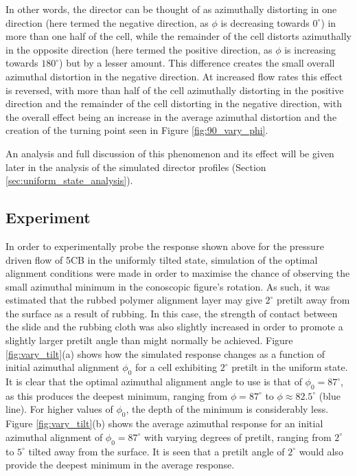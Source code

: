 In other words, the director can be thought of as azimuthally distorting in one direction (here termed the negative direction, as $\phi$ is decreasing towards $0^{\circ}$) in more than one half of the cell, while the remainder of the cell distorts azimuthally in the opposite direction (here termed the positive direction, as $\phi$ is increasing towards $180^{\circ}$) but by a lesser amount. This difference creates the small overall azimuthal distortion in the negative direction. At increased flow rates this effect is reversed, with more than half of the cell azimuthally distorting in the positive direction and the remainder of the cell distorting in the negative direction, with the overall effect being an increase in the average azimuthal distortion and the creation of the turning point seen in Figure \ref{fig:90_vary_phi}. 

An analysis and full discussion of this phenomenon and its effect will be given later in the analysis of the simulated director profiles (Section \ref{sec:uniform_state_analysis}).

\subsection{Experiment}
\label{sec:uniform_experiment}
In order to experimentally probe the response shown above for the pressure driven flow of 5CB in the uniformly tilted state, simulation of the optimal alignment conditions were made in order to maximise the chance of observing the small azimuthal minimum in the conoscopic figure's rotation. As such, it was estimated that the rubbed polymer alignment layer may give $2^{\circ}$ pretilt away from the surface as a result of rubbing. In this case, the strength of contact between the slide and the rubbing cloth was also slightly increased in order to promote a slightly larger pretilt angle than might normally be achieved. Figure \ref{fig:vary_tilt}(a) shows how the simulated response changes as a function of initial azimuthal alignment $\phi_0$ for a cell exhibiting $2^{\circ}$ pretilt in the uniform state. It is clear that the optimal azimuthal alignment angle to use is that of $\phi_0=87^{\circ}$, as this produces the deepest minimum, ranging from $\phi=87^{\circ}$ to $\phi\approx82.5^{\circ}$ (blue line). For higher values of $\phi_0$, the depth of the minimum is considerably less. Figure \ref{fig:vary_tilt}(b) shows the average azimuthal response for an initial azimuthal alignment of $\phi_0=87^{\circ}$ with varying degrees of pretilt, ranging from $2^{\circ}$ to $5^{\circ}$ tilted away from the surface. It is seen that a pretilt angle of $2^{\circ}$ would also provide the deepest minimum in the average response.

